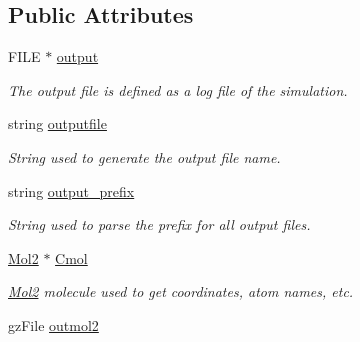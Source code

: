 \subsection*{Public Attributes}
\begin{DoxyCompactItemize}
\item 
\hypertarget{classWRITER_abe253e51ab49fe0837757383267e9f98}{
FILE $\ast$ \hyperlink{classWRITER_abe253e51ab49fe0837757383267e9f98}{output}}
\label{classWRITER_abe253e51ab49fe0837757383267e9f98}

\begin{DoxyCompactList}\small\item\em The output file is defined as a log file of the simulation. \item\end{DoxyCompactList}\item 
\hypertarget{classWRITER_afc513098438e6b6a0cfc075916cbd6a6}{
string \hyperlink{classWRITER_afc513098438e6b6a0cfc075916cbd6a6}{outputfile}}
\label{classWRITER_afc513098438e6b6a0cfc075916cbd6a6}

\begin{DoxyCompactList}\small\item\em String used to generate the output file name. \item\end{DoxyCompactList}\item 
\hypertarget{classWRITER_a5089c4353a7e6cd0421782ce60d086b9}{
string \hyperlink{classWRITER_a5089c4353a7e6cd0421782ce60d086b9}{output\_\-prefix}}
\label{classWRITER_a5089c4353a7e6cd0421782ce60d086b9}

\begin{DoxyCompactList}\small\item\em String used to parse the prefix for all output files. \item\end{DoxyCompactList}\item 
\hypertarget{classWRITER_aaea0524b142c7c6e27082d070b5ba95c}{
\hyperlink{classMol2}{Mol2} $\ast$ \hyperlink{classWRITER_aaea0524b142c7c6e27082d070b5ba95c}{Cmol}}
\label{classWRITER_aaea0524b142c7c6e27082d070b5ba95c}

\begin{DoxyCompactList}\small\item\em \hyperlink{classMol2}{Mol2} molecule used to get coordinates, atom names, etc. \item\end{DoxyCompactList}\item 
\hypertarget{classWRITER_acb2209762ef921d0e04efd4c9ad5fd76}{
gzFile \hyperlink{classWRITER_acb2209762ef921d0e04efd4c9ad5fd76}{outmol2}}
\label{classWRITER_acb2209762ef921d0e04efd4c9ad5fd76}


\end{DoxyCompactItemize}
